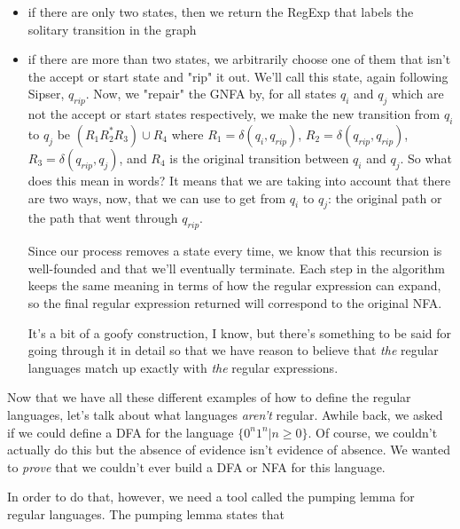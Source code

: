 \documentclass[11pt]{article}
\begin{document}
\begin{itemize}
\item if there are only two states, then we return the RegExp that labels the solitary transition in the graph
\item if there are more than two states, we arbitrarily choose one of them that isn't the accept or start state and "rip" it out. We'll call this state, again following Sipser, $q_{rip}$. Now, we "repair" the GNFA by, for all states $q_i$ and $q_j$ which are not the accept or start states respectively, we make the new transition from $q_i$ to $q_j$ be $(R_1 R_2^* R_3) \cup R_4$ where $R_1 = \delta(q_i,q_{rip})$, $R_2 = \delta(q_{rip},q_{rip})$, $R_3 = \delta(q_{rip},q_j)$, and $R_4$ is the original transition between $q_i$ and $q_j$. So what does this mean in words? It means that we are taking into account that there are two ways, now, that we can use to get from $q_i$ to $q_j$: the original path or the path that went through $q_{rip}$. 

Since our process removes a state every time, we know that this recursion is well-founded and that we'll eventually terminate. Each step in the algorithm keeps the same meaning in terms of how the regular expression can expand, so the final regular expression returned will correspond to the original NFA.

It's a bit of a goofy construction, I know, but there's something to be said for going through it in detail so that we have reason to believe that \emph{the} regular languages match up exactly with \emph{the} regular expressions.
\end{itemize}

Now that we have all these different examples of how to define the regular languages, let's talk about what languages \emph{aren't} regular. Awhile back, we asked if we could define a DFA for the language $\{0^n1^n | n \geq 0\}$. Of course, we couldn't actually do this but the absence of evidence isn't evidence of absence. We wanted to \emph{prove} that we couldn't ever build a DFA or NFA for this language.

In order to do that, however, we need a tool called the pumping lemma for regular languages. The pumping lemma states that 
\end{document}
